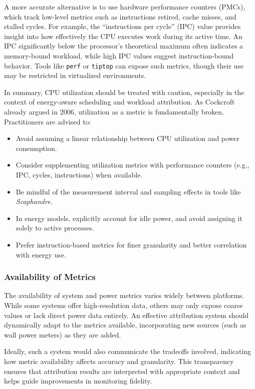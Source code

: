 A more accurate alternative is to use hardware performance counters (PMCs), which track low-level metrics such as instructions retired, cache misses, and stalled cycles. For example, the ``instructions per cycle'' (IPC) value provides insight into how effectively the CPU executes work during its active time. An IPC significantly below the processor's theoretical maximum often indicates a memory-bound workload, while high IPC values suggest instruction-bound behavior. Tools like \texttt{perf} or \texttt{tiptop} can expose such metrics, though their use may be restricted in virtualized environments.

In summary, CPU utilization should be treated with caution, especially in the context of energy-aware scheduling and workload attribution. As Cockcroft already argued in 2006, utilization as a metric is fundamentally broken\parencite{cockcroft2006utilization}. Practitioners are advised to:
\begin{itemize}
    \item Avoid assuming a linear relationship between CPU utilization and power consumption.
    \item Consider supplementing utilization metrics with performance counters (e.g., IPC, cycles, instructions) when available.
    \item Be mindful of the measurement interval and sampling effects in tools like \textit{Scaphandre}.
    \item In energy models, explicitly account for idle power, and avoid assigning it solely to active processes.
    \item Prefer instruction-based metrics for finer granularity and better correlation with energy use.
\end{itemize}

\subsubsection{Availability of Metrics}

The availability of system and power metrics varies widely between platforms. While some systems offer high-resolution data, others may only expose coarse values or lack direct power data entirely. An effective attribution system should dynamically adapt to the metrics available, incorporating new sources (such as wall power meters) as they are added.

Ideally, such a system would also communicate the tradeoffs involved, indicating how metric availability affects accuracy and granularity. This transparency ensures that attribution results are interpreted with appropriate context and helps guide improvements in monitoring fidelity.

